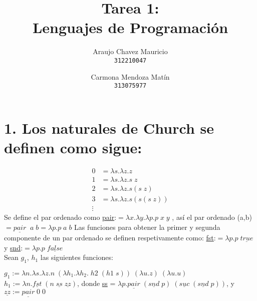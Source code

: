 \documentclass[11pt, a4paper]{report}
\begin{document}
\title{Tarea 1: \\Lenguajes de Programaci\'on}
\author{
  Araujo Chavez Mauricio\\
  \texttt{312210047}
  \and
  Carmona Mendoza Mat\'in\\
  \texttt{313075977}
}
\date{}
\maketitle
\section*{1. Los naturales de Church se definen como sigue:}
 \begin{align*}
   0 &= \lambda s.\lambda z.z\\
	1 &= \lambda s.\lambda z.s\;z\\
	2 &= \lambda s.\lambda z.s (s\;z)\\
        3 &= \lambda s.\lambda z.s(s (s\;z))\\
	\vdots 
 \end{align*}
 Se define el par ordenado como \underline{pair}:$= \lambda x.\lambda y. \lambda p. p\;x\;y$
 , así el par ordenado (a,b)$= \underline{pair}\;\; a\;b = \lambda p. p\;a\;b$ Las funciones 
 para obtener la primer y segunda componente de un par ordenado se definen respetivamente 
 como: \underline{fst}:$= \lambda p. p\;\underline{true}$ y \underline{snd}:$= \lambda p. 
 p\;\underline{false}$\\ 
 Sean $g_{1}$, $h_{1}$ las siguientes funciones:
  \begin{center}
	$g_{1}:= \lambda n. \lambda s. \lambda z. n\;(\lambda h_{1}. \lambda h_{2}.\;h2\;
    (h1\;s)) \;(\lambda u.z)\;(\lambda u.u)$\\
	$h_{1}:=\lambda n.\underline{fst}\;(n\;\underline{ss}\;\underline{zz})$, donde 
    \underline{ss} = $\lambda p.\underline{pair}\;(\underline{snd}\;p)\;
    (\underline{suc}\;(\underline{snd}\;p))$, y $\underline{zz} := \underline{pair}\;0\;0$\\
  \end{center}
\end{document}
